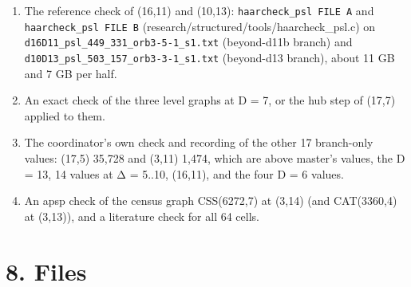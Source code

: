 \documentclass[
  10pt,
]{article}
\providecommand{\tightlist}{%
  \setlength{\itemsep}{0pt}\setlength{\parskip}{0pt}}
\begin{document}
\begin{enumerate}
\def\labelenumi{\arabic{enumi}.}
\tightlist
\item
  The reference check of (16,11) and (10,13): \texttt{haarcheck\_\allowbreak{}psl\ FILE\ A} and \texttt{haarcheck\_\allowbreak{}psl\ FILE\ B}
  (research/structured/tools/haarcheck\_psl.c) on \texttt{d16D11\_\allowbreak{}psl\_\allowbreak{}449\_\allowbreak{}331\_\allowbreak{}orb3-5-1\_\allowbreak{}s1.txt} (beyond-d11b
  branch) and \texttt{d10D13\_\allowbreak{}psl\_\allowbreak{}503\_\allowbreak{}157\_\allowbreak{}orb3-3-1\_\allowbreak{}s1.txt} (beyond-d13 branch), about 11 GB and 7 GB per half.
\item
  An exact check of the three level graphs at D = 7, or the hub step of (17,7) applied to them.
\item
  The coordinator's own check and recording of the other 17 branch-only values: (17,5) 35,728 and (3,11) 1,474, which
  are above master's values, the D = 13, 14 values at Δ = 5..10, (16,11), and the four D = 6 values.
\item
  An apsp check of the census graph CSS(6272,7) at (3,14) (and CAT(3360,4) at (3,13)), and a literature check for all
  64 cells.
\end{enumerate}

\hypertarget{files}{%
\section{8. Files}\label{files}}
\end{document}
